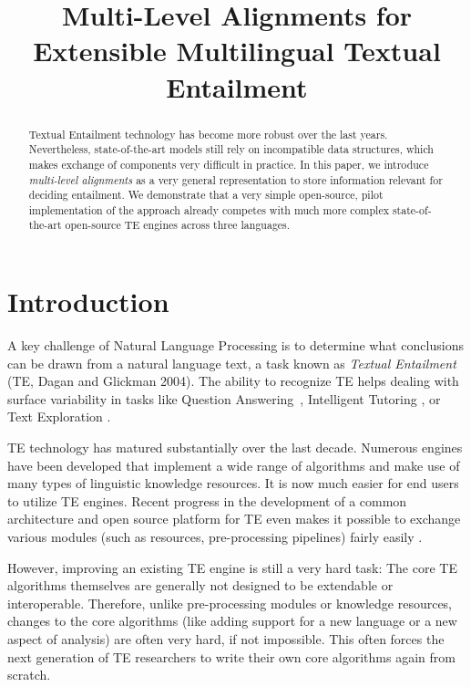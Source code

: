 \documentclass[11pt,letterpaper]{article}
\title{Multi-Level Alignments for Extensible Multilingual Textual
  Entailment}
\date{}
\begin{document}
\maketitle
\begin{abstract}
  Textual Entailment technology has become more robust over the last
  years. Nevertheless, state-of-the-art models still rely on
  incompatible data structures, which makes exchange of components
  very difficult in practice. In this paper, we introduce   {\em
  multi-level alignments} as a very general representation to store
  information relevant for deciding entailment.
  We demonstrate that a very simple open-source, pilot implementation
  of the approach already competes with much more complex
  state-of-the-art open-source TE engines across three languages. 
\end{abstract}

\section{Introduction}
A key challenge of Natural Language Processing is to determine what
conclusions can be drawn from a natural language text, a task known as
\textit{Textual Entailment} (TE, Dagan and Glickman
2004).\nocite{dagan04:_probab_textual_entail} The ability to recognize
TE helps dealing with surface variability in tasks like Question
Answering~\cite{harabagiu-hickl:2006:COLACL}, Intelligent Tutoring
\cite{nielsen09:_recog_entail_in_intel_tutor_system}, or Text
Exploration \cite{berant2012learning}.

TE technology has matured substantially over the last decade. Numerous
engines have been developed that implement a wide range of algorithms
and make use of many types of linguistic knowledge resources. It is
now much easier for end users to utilize TE engines. Recent progress
in the development of a common architecture and open source platform
for TE even makes it possible to exchange various modules (such as
resources, pre-processing pipelines) fairly easily \cite{EOP-arch}.

However, improving an existing TE engine is still a very hard task:
The core TE algorithms themselves are generally not designed to be
extendable or interoperable. Therefore, unlike pre-processing modules 
or knowledge resources, changes to the core algorithms (like adding
support for a new language or a new aspect of analysis) are often very
hard, if not impossible. This often forces the next generation of TE
researchers to write their own core algorithms again from scratch. 
\end{document}
